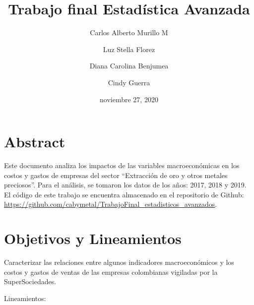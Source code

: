 \documentclass[
  11pt,
  a4paper,
]{book}
\title{Trabajo final Estadística Avanzada}
\author{Carlos Alberto Murillo M \and Luz Stella Florez \and Diana Carolina Benjumea \and Cindy Guerra}
\date{noviembre 27, 2020}
\begin{document}
\frontmatter
\maketitle

{
\setcounter{tocdepth}{2}
\tableofcontents
}
\mainmatter
\hypertarget{abstract}{%
\chapter*{Abstract}\label{abstract}}

Este documento analiza los impactos de las variables macroeconómicas en
los costos y gastos de empresas del sector ``Extracción de oro y otros
metales preciosos''. Para el análisis, se tomaron los datos de los años:
2017, 2018 y 2019. El código de este trabajo se encuentra almacenado en
el repositorio de Github:
\url{https://github.com/cabymetal/TrabajoFinal_estadisticos_avanzados}.

\hypertarget{objetivos-y-lineamientos}{%
\chapter{Objetivos y Lineamientos}\label{objetivos-y-lineamientos}}

Caracterizar las relaciones entre algunos indicadores macroeconómicos y
los costos y gastos de ventas de las empresas colombianas vigiladas por
la SuperSociedades.

Lineamientos:
\end{document}
